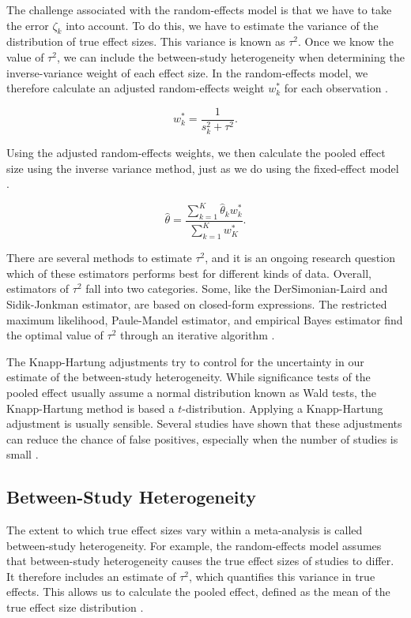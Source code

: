 \documentclass[../../../main.tex]{subfiles}
\begin{document}
The challenge associated with the random-effects model is that we have to take the error $\zeta_k$ into account. To do this, we have to estimate the variance of the distribution of true effect sizes. This variance is known as $\tau^2$. Once we know the value of $\tau^2$, we can include the between-study heterogeneity when determining the inverse-variance weight of each effect size. In the random-effects model, we therefore calculate an adjusted random-effects weight $w_k^\ast$ for each observation \autocite{Harrer2021}.

\begin{equation}
w_k^\ast = \frac{1}{s_k^2+\tau^2}.
\end{equation}

Using the adjusted random-effects weights, we then calculate the pooled effect size using the inverse variance method, just as we do using the fixed-effect model \autocite{Harrer2021}.

\begin{equation}
\hat{\theta} = \frac{\sum_{k=1}^{K}\hat{\theta}_kw_k^\ast}{\sum_{k=1}^{K}w_K^\ast}.
\end{equation}

There are several methods to estimate $\tau^2$, and it is an ongoing research question which of these estimators performs best for different kinds of data. Overall, estimators of $\tau^2$ fall into two categories. Some, like the DerSimonian-Laird and Sidik-Jonkman estimator, are based on closed-form expressions. The restricted maximum likelihood, Paule-Mandel estimator, and empirical Bayes estimator find the optimal value of $\tau^2$ through an iterative algorithm \autocite{Harrer2021}.

The Knapp-Hartung adjustments try to control for the uncertainty in our estimate of the between-study heterogeneity. While significance tests of the pooled effect usually assume a normal distribution known as Wald tests, the Knapp-Hartung method is based a $t$-distribution. Applying a Knapp-Hartung adjustment is usually sensible. Several studies have shown that these adjustments can reduce the chance of false positives, especially when the number of studies is small \autocite{Harrer2021}.

\subsection{Between-Study Heterogeneity}

The extent to which true effect sizes vary within a meta-analysis is called between-study heterogeneity. For example, the random-effects model assumes that between-study heterogeneity causes the true effect sizes of studies to differ. It therefore includes an estimate of $\tau^2$, which quantifies this variance in true effects. This allows us to calculate the pooled effect, defined as the mean of the true effect size distribution \autocite{Harrer2021}.
\end{document}
